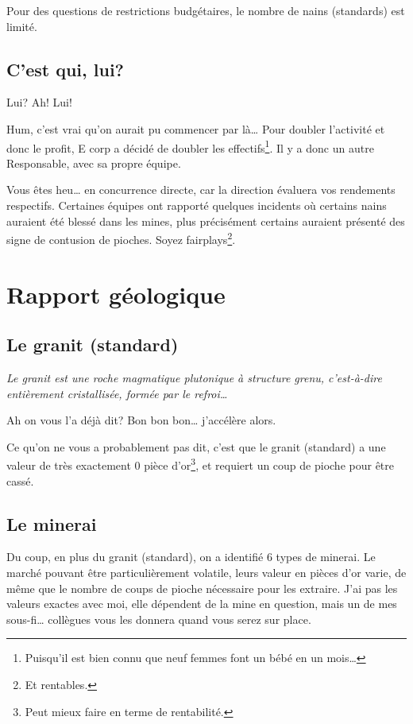   Pour des questions de restrictions budgétaires, le nombre de nains
  (standards) est limité.

\subsection{C'est qui, lui?}

  Lui? Ah! Lui!

  Hum, c'est vrai qu'on aurait pu commencer par là\ldots{} Pour doubler
  l'activité et donc le profit, E corp a  décidé de doubler les
  effectifs\footnote{Puisqu'il est bien connu que neuf femmes font un bébé en
  un mois\ldots{}}. Il y a donc un autre Responsable, avec sa propre équipe.

  Vous êtes heu\ldots{} en concurrence directe, car la direction évaluera vos
  rendements respectifs. Certaines équipes ont rapporté quelques incidents où
  certains nains auraient été blessé dans les mines, plus précisément certains
  auraient présenté des signe de contusion de pioches. Soyez
  fairplays\footnote{Et rentables.}.

\newpage

\section{Rapport géologique}

\subsection{Le granit (standard)}

  \textit{Le granit est une roche magmatique plutonique à structure grenu,
  c'est-à-dire entièrement cristallisée, formée par le refroi\ldots{}}

  Ah on vous l'a déjà dit? Bon bon bon\ldots{} j'accélère alors.

  Ce qu'on ne vous a probablement pas dit, c'est que le granit (standard) a une
  valeur de très exactement 0 pièce d'or\footnote{Peut mieux faire en terme de
  rentabilité.}, et requiert un coup de pioche pour être cassé.

\subsection{Le minerai}

  Du coup, en plus du granit (standard), on a identifié 6 types de minerai.  Le
  marché pouvant être particulièrement volatile, leurs valeur en pièces d'or
  varie, de même que le nombre de coups de pioche nécessaire pour les extraire.
  J'ai pas les valeurs exactes avec moi, elle dépendent de la mine en question,
  mais un de mes sous-fi\ldots{} collègues vous les donnera quand vous serez
  sur place.

